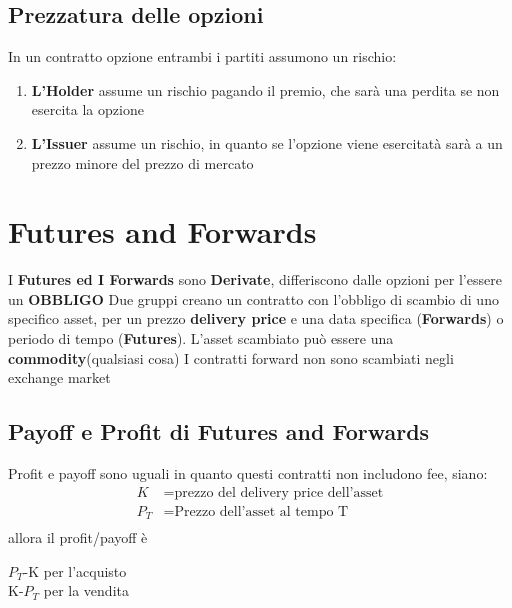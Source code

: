\documentclass[a4paper,11pt]{report}
\begin{document}
{\subsection{Prezzatura delle opzioni}
	In un contratto opzione entrambi i partiti assumono un rischio:
\begin{enumerate}
	\item \textbf{L'Holder} assume un rischio pagando il premio, che sarà una perdita se non esercita la opzione
	\item \textbf{L'Issuer} assume un rischio, in quanto se l'opzione viene esercitatà sarà a un prezzo minore del prezzo di 	mercato
\end{enumerate}
\newpage

\section{Futures and Forwards}
	I \textbf{Futures ed I Forwards} sono \textbf{Derivate}, differiscono dalle opzioni per l'essere un \textbf{OBBLIGO} \newline
	Due gruppi creano un contratto con l'obbligo di scambio di uno specifico asset, per un prezzo \textbf{delivery price} e una 		data specifica (\textbf{Forwards}) o periodo di tempo (\textbf{Futures}). \newline
	L'asset scambiato può essere una \textbf{commodity}(qualsiasi cosa) \newline
	I contratti forward non sono scambiati negli exchange market
\subsection{Payoff e Profit di Futures and Forwards}
	Profit e payoff sono uguali in quanto questi contratti non includono fee, \newline
	siano:
\begin{align*}
	K &= \text{prezzo del delivery price dell'asset}\\
	\text{$P_T$} &= \text{Prezzo dell'asset al tempo T} \\
\end{align*}
	allora il profit/payoff è
\begin{center}
	$P_T$-K  \small{per l'acquisto} \\
	K-$P_T$ \small{per la vendita}
\end{center}
\newpage

}
\end{document}
